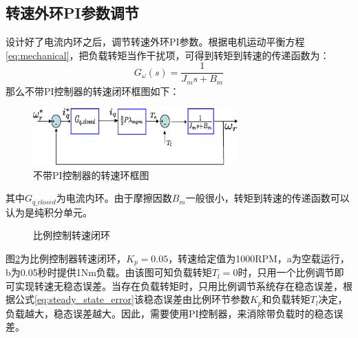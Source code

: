 \subsection{转速外环PI参数调节}
设计好了电流内环之后，调节转速外环PI参数。根据电机运动平衡方程\ref{eq:mechanical}，把负载转矩当作干扰项，可得到转矩到转速的传递函数为：
\begin{equation}
	G_{\omega}(s)=\frac{1}{J_{m}s+B_{m}}
\end{equation}
那么不带PI控制器的转速闭环框图如下：
\begin{figure}[H]
	\centering
	\includegraphics[width=0.7\textwidth]{figs/speed_without_PI.eps}
	\caption{不带PI控制器的转速环框图}
	\label{fig:speed_without_PI}
\end{figure}
其中$G_{q\_closed}$为电流内环。由于摩擦因数$B_{m}$一般很小，转矩到转速的传递函数可以认为是纯积分单元。
\begin{figure} [h]
	\centering%
	\hspace{2em}%
	\caption{比例控制转速闭环}
	\label{fig:Kp_speed_loop}
\end{figure}
图\ref{fig:Kp_speed_loop}为比例控制器转速闭环，$K_{p}=0.05$，转速给定值为1000RPM，a为空载运行，b为0.05秒时提供1Nm负载。由该图可知负载转矩$T_{l}=0$时，只用一个比例调节即可实现转速无稳态误差。当存在负载转矩时，只用比例调节系统存在稳态误差，根据公式\ref{eq:steady_state_error}该稳态误差由比例环节参数$K_{p}$和负载转矩$T_{l}$决定，负载越大，稳态误差越大。因此，需要使用PI控制器，来消除带负载时的稳态误差。
